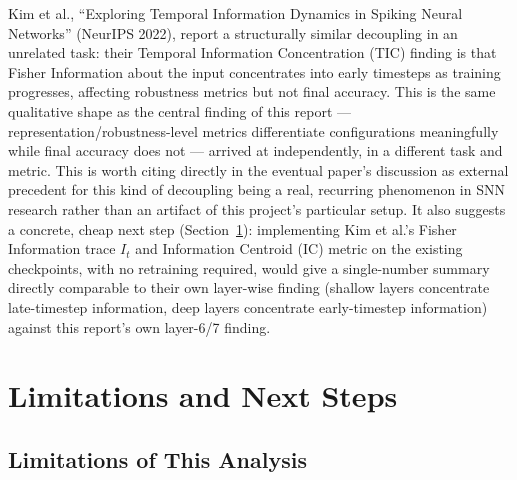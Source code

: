 \documentclass[11pt]{article}
\begin{document}
Kim et al., ``Exploring Temporal Information Dynamics in Spiking Neural Networks'' (NeurIPS 2022),
report a structurally similar decoupling in an unrelated task: their Temporal Information
Concentration (TIC) finding is that Fisher Information about the input concentrates into early
timesteps as training progresses, affecting robustness metrics but not final accuracy. This is the
same qualitative shape as the central finding of this report --- representation/robustness-level
metrics differentiate configurations meaningfully while final accuracy does not --- arrived at
independently, in a different task and metric. This is worth citing directly in the eventual paper's
discussion as external precedent for this kind of decoupling being a real, recurring phenomenon in
SNN research rather than an artifact of this project's particular setup. It also suggests a concrete,
cheap next step (Section~\ref{sec:limitations}): implementing Kim et al.'s Fisher Information trace
$I_t$ and Information Centroid (IC) metric on the existing checkpoints, with no retraining required,
would give a single-number summary directly comparable to their own layer-wise finding (shallow
layers concentrate late-timestep information, deep layers concentrate early-timestep information)
against this report's own layer-6/7 finding.

\section{Limitations and Next Steps}
\label{sec:limitations}

\subsection{Limitations of This Analysis}
\end{document}
